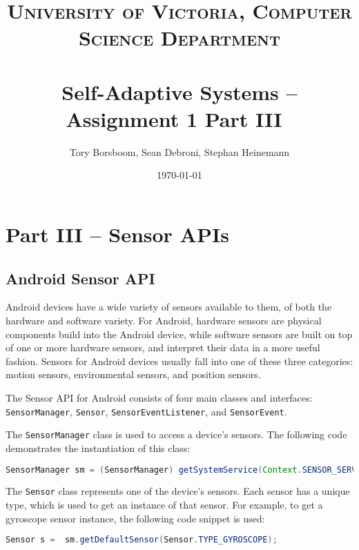 \documentclass[paper=letter, fontsize=11pt]{scrartcl}
\title{	
\normalfont \normalsize 
\textsc{University of Victoria, Computer Science Department} \\ [25pt]
\horrule{0.5pt} \\[0.4cm]
\huge Self-Adaptive Systems -- Assignment 1 Part III\
\horrule{2pt} \\[0.5cm]
}
\author{Tory Borsboom, Sean Debroni, Stephan Heinemann}
\date{\normalsize\today}
\numberwithin{equation}{section}
\numberwithin{figure}{section}
\numberwithin{table}{section}
\begin{document}
\maketitle 

\small
\clearpage
\section{Part III -- Sensor APIs}
\label{sec:part3}

\subsection{Android Sensor API}
\label{sec:android_sensor_api}
\par
Android devices have a wide variety of sensors available to them, of both the
hardware and software variety. For Android, hardware sensors are physical
components build into the Android device, while software sensors are built on
top of one or more hardware sensors, and interpret their data in a more useful
fashion. Sensors for Android devices usually fall into one of these three
categories: motion sensors, environmental sensors, and position sensors.
\newline

\par
The Sensor \ac{API} for Android consists of four main classes and interfaces:
\texttt{SensorManager}, \texttt{Sensor}, \texttt{SensorEventListener}, and
\texttt{SensorEvent}.
\newline

\par
The \texttt{SensorManager} class is used to access a device's sensors. The
following code demonstrates the instantiation of this class:

\begin{lstlisting}[basicstyle=\small,language=Java]
	SensorManager sm = (SensorManager) getSystemService(Context.SENSOR_SERVICE);
\end{lstlisting}

\par
The \texttt{Sensor} class represents one of the device's sensors. Each sensor
has a unique type, which is used to get an instance of that sensor.
For example, to get a gyroscope sensor instance, the following code snippet
is used:

\begin{lstlisting}[basicstyle=\small,language=Java]
	Sensor s =  sm.getDefaultSensor(Sensor.TYPE_GYROSCOPE);
\end{lstlisting}
\end{document}
